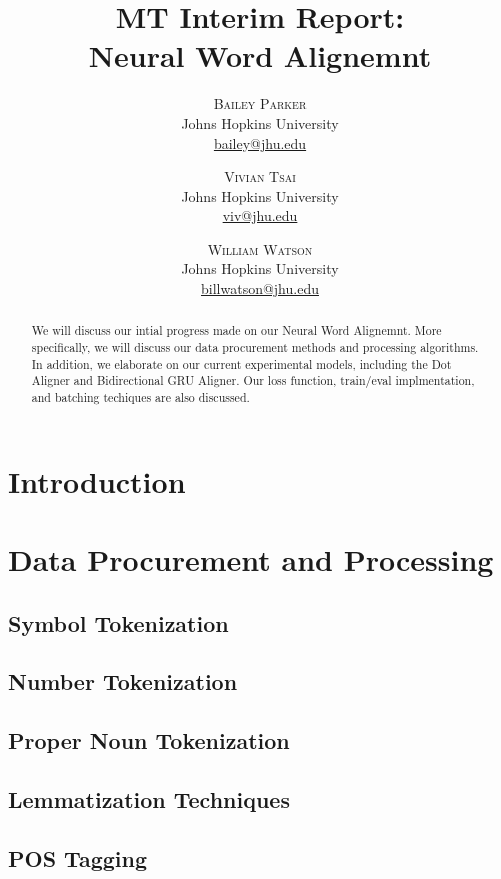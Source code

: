 \documentclass[twoside,twocolumn]{article}
\title{MT Interim Report: \\ Neural Word Alignemnt}
\author{%
\textsc{Bailey Parker} \\[1ex]
\normalsize Johns Hopkins University \\
\normalsize \href{mailto:bailey@jhu.edu}{bailey@jhu.edu}
 \and
 \textsc{Vivian Tsai} \\[1ex]
\normalsize Johns Hopkins University \\
\normalsize \href{mailto:viv@jhu.edu}{viv@jhu.edu}
 \and
  \textsc{William Watson} \\[1ex]
\normalsize Johns Hopkins University \\
\normalsize \href{mailto:billwatson@jhu.edu}{billwatson@jhu.edu}
}
\date{}
\begin{document}
\maketitle




\begin{abstract}
We will discuss our intial progress made on our Neural Word Alignemnt. More specifically, we will discuss our data procurement methods and processing algorithms. In addition, we elaborate on our current experimental models, including the Dot Aligner and Bidirectional GRU Aligner. Our loss function, train/eval implmentation, and batching techiques are also discussed.
\end{abstract}

\section{Introduction}

\section{Data Procurement and Processing}
\subsection{Symbol Tokenization}
\subsection{Number Tokenization}
\subsection{Proper Noun Tokenization}
\subsection{Lemmatization Techniques}
\subsection{POS Tagging}
\end{document}
